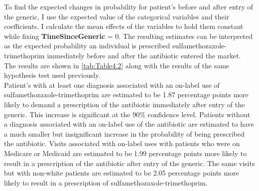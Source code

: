 \indent To find the expected changes in probability for patient's before and after entry of the generic, I use the expected value of the categorical variables and their coefficients. I calculate the mean effects of the variables to hold them constant while fixing \textbf{TimeSinceGeneric} = 0. The resulting estimates can be interpreted as the expected probability an individual is prescribed sulfamethozaxole-trimethoprim immediately before and after the antibiotic entered the market. The results are shown in \autoref{tab:Table4.2} along with the results of the same hypothesis test used previously.\\
\indent Patient's with at least one diagnosis associated with an on-label use of sulfamethozaxole-trimethoprim are estimated to be 1.87 percentage points more likely to demand a prescription of the antibiotic immediately after entry of the generic. This increase is significant at the 90\% confidence level. Patients without a diagnosis associated with an on-label use of the antibiotic are estimated to have a much smaller but insignificant increase in the probability of being prescribed the antibiotic. Visits associated with on-label uses with patients who were on Medicare or Medicaid are estimated to be 1.99 percentage points more likely to result in a prescription of the antibiotic after entry of the generic. The same visits but with non-white patients are estimated to be 2.05 percentage points more likely to result in a prescription of sulfamethozaxole-trimethoprim.\\

